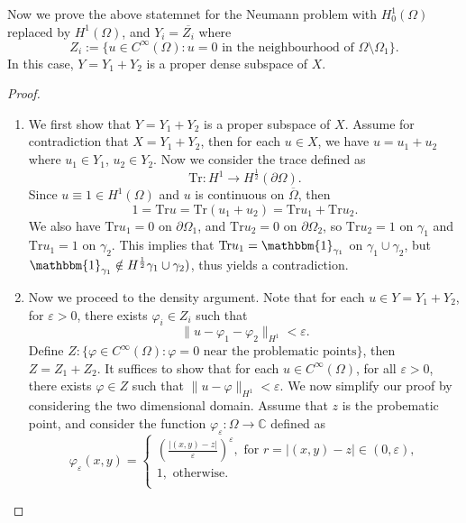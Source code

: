 \documentclass[11pt, a4paper]{amsart}
\begin{document}
Now we prove the above statemnet for the Neumann problem with $H_{0}^{1}(\Omega)$ replaced by $H^1(\Omega)$, and $Y_i=\overline{Z_i}$ where $$Z_i:=\{u\in C^{\infty}(\Omega)\colon u=0 \mbox{ in the neighbourhood of } \Omega\setminus\Omega_1\}.$$ 
In this case, $Y=Y_1+Y_2$ is a proper dense subspace of $X$.
\begin{proof}
\begin{enumerate}
\item
We first show that $Y=Y_1+Y_2$ is a proper subspace of $X$. Assume for contradiction that $X=Y_1+Y_2$, then for each $u\in X$, we have $u=u_1+u_2$ where $u_1\in Y_1$, $u_2\in Y_2$. Now we consider the trace defined as
$$\mathrm{Tr}\colon H^{1} \to H^{\frac{1}{2}}(\partial \Omega).$$
Since $u\equiv 1\in H^1(\Omega)$ and $u$ is continuous on $\overline{\Omega}$, then 
$$1=\mathrm{Tr}u=\mathrm{Tr}(u_1+u_2)=\mathrm{Tr}u_1+\mathrm{Tr}u_2.$$
We also have $\mathrm{Tr}u_1=0$ on $\partial\Omega_1$, and $\mathrm{Tr}u_2=0$ on $\partial\Omega_2$, so $\mathrm{Tr}u_2=1$ on $\gamma_1$ and $\mathrm{Tr}u_1=1$ on $\gamma_2$. This implies that $\mathrm{Tr}u_1=\mathbbm{1}_{\gamma_1}$ on $\gamma_1\cup\gamma_2$, but $\mathbbm{1}_{\gamma_1}\notin H^{\frac{1}{2}}\gamma_1\cup\gamma_2)$, thus yields a contradiction.

\item
Now we proceed to the density argument. Note that for each $u\in Y=Y_1+Y_2$, for $\varepsilon>0$,  there exists $\varphi_i\in Z_i$ such that $$\|u-\varphi_1-\varphi_2\|_{H^1}<\varepsilon.$$ Define
$Z:\{\varphi \in C^{\infty}(\Omega)\colon \varphi=0 \mbox{ near the problematic points}\}$, then $Z=Z_1+Z_2$.
 It suffices to show that for each $u\in C^{\infty}(\Omega)$, for all $\varepsilon>0$, there exists $\varphi\in Z$ such that $\|u-\varphi\|_{H^1}<\varepsilon$.
We now simplify our proof by considering the two dimensional domain. Assume that $z$ is the probematic point, and consider the function $\varphi_{\varepsilon}\colon \Omega\to\mathbb{C}$ defined as 
$$\varphi_{\varepsilon}(x,y)=\begin{cases} \left(\frac{|(x,y)-z|}{\varepsilon}\right)^{\varepsilon},\mbox{ for } r=|(x,y)-z|\in(0,\varepsilon), \\
1,  \mbox{ otherwise}.\\
\end{cases}$$



\end{enumerate}
\end{proof}
\end{document}
